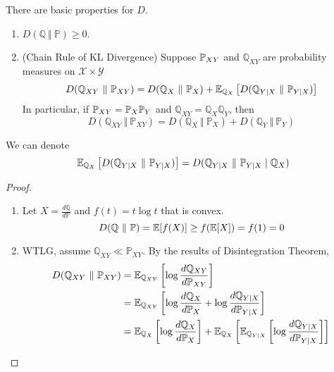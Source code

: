 \begin{enumerate}[label=\arabic{*}.]
	\begin{prop}
	    There are basic properties for $D$.
	    \begin{enumerate}[label=(\arabic{*})]
	    	\item $D(\mathbb{Q} ~\Vert~ \mathbb{P}) \geq 0$.
	    	\item (Chain Rule of KL Divergence) Suppose $\mathbb{P}_{XY}$ and $\mathbb{Q}_{XY}$ are probability measures on $\mathcal{X} \times \mathcal{Y}$
	    	\begin{equation*}
	    	    D(\mathbb{Q}_{XY} ~\Vert~ \mathbb{P}_{XY}) =  D(\mathbb{Q}_{X} ~\Vert~ \mathbb{P}_{X}) + \mathbb{E}_{\mathbb{Q}_{X}}\left[D(\mathbb{Q}_{Y\mid X} ~\Vert~ \mathbb{P}_{Y\mid X})\right]
	    	\end{equation*}
	    	In particular, if $\mathbb{P}_{XY} = \mathbb{P}_{X}\mathbb{P}_{Y}$ and $\mathbb{Q}_{XY} = \mathbb{Q}_{X}\mathbb{Q}_{Y}$, then
	    	\begin{equation*}
	    	    D(\mathbb{Q}_{XY} ~\Vert~ \mathbb{P}_{XY}) = D(\mathbb{Q}_{X} ~\Vert~ \mathbb{P}_{X}) +D(\mathbb{Q}_{Y} ~\Vert~ \mathbb{P}_{Y})
	    	\end{equation*}
	    \end{enumerate}
	\end{prop}
	\begin{rmk}
	    We can denote
	    \begin{equation*}
	        \mathbb{E}_{\mathbb{Q}_{X}}\left[D(\mathbb{Q}_{Y\mid X} ~\Vert~ \mathbb{P}_{Y\mid X})\right] = D(\mathbb{Q}_{Y\mid X} ~\Vert~ \mathbb{P}_{Y\mid X} \mid \mathbb{Q}_{X})
	    \end{equation*}
	\end{rmk}
	\begin{proof}
	    \begin{enumerate}[label=(\arabic{*})]
	    	\item Let $X = \frac{d\mathbb{Q}}{d\mathbb{P}}$ and $f(t) = t\log t$ that is convex.
	    	\begin{equation*}
	    	    D(\mathbb{Q} ~\Vert~ \mathbb{P}) = \mathbb{E}[f(X)] \geq f(\mathbb{E}[X]) = f(1) = 0
	    	\end{equation*}
	    	\item WTLG, assume $\mathbb{Q}_{XY} \ll \mathbb{P}_{XY}$. By the results of Disintegration Theorem,
	    	\begin{equation*}
	    	    \begin{aligned}
	    	    	D(\mathbb{Q}_{XY} ~\Vert~ \mathbb{P}_{XY}) &= \mathbb{E}_{\mathbb{Q}_{XY}}\left[\log \frac{d\mathbb{Q}_{XY}}{d\mathbb{P}_{XY}}\right] \\
	    	    	&=\mathbb{E}_{\mathbb{Q}_{XY}}\left[\log \frac{d\mathbb{Q}_{X}}{d\mathbb{P}_{X}} + \log \frac{d\mathbb{Q}_{Y\mid X}}{d\mathbb{P}_{Y \mid X}}\right] \\
	    	    	&= \mathbb{E}_{\mathbb{Q}_{X}}\left[\log \frac{d\mathbb{Q}_{X}}{d\mathbb{P}_{X}}\right] + \mathbb{E}_{\mathbb{Q}_{X}}\left[\mathbb{E}_{\mathbb{Q}_{Y\mid X}}\left[\log \frac{d\mathbb{Q}_{Y\mid X}}{d\mathbb{P}_{Y \mid X}}\right]\right] \qedhere
	    	    \end{aligned}
	    	\end{equation*}
	    \end{enumerate}
	\end{proof}


\end{enumerate}
